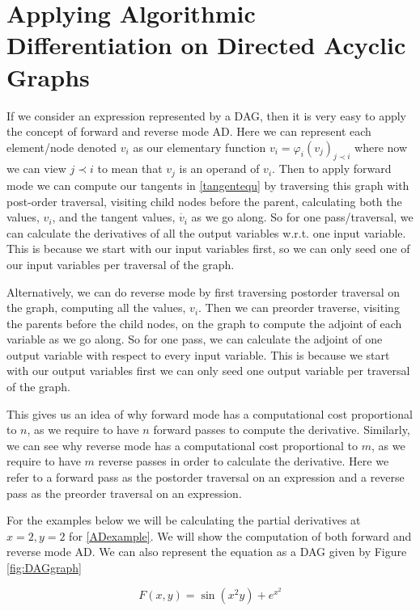 \documentclass{article}
\begin{document}
\section{Applying Algorithmic Differentiation on Directed Acyclic Graphs}

If we consider an expression represented by a DAG, then it is very easy to apply the concept of forward and reverse mode AD. Here we can represent each element/node denoted $v_i$ as our elementary function $v_i = \varphi_i (v_j)_{j \prec i}$ where now we can view $j \prec i$ to mean that $v_j$ is an operand of $v_i$. Then to apply forward mode we can compute our tangents in \eqref{tangentequ} by traversing this graph with post-order traversal, visiting child nodes before the parent, calculating both the values, $v_i$, and the tangent values, $\Dot{v_i}$ as we go along. So for one pass/traversal, we can calculate the derivatives of all the output variables w.r.t. one input variable. This is because we start with our input variables first, so we can only seed one of our input variables per traversal of the graph.

Alternatively, we can do reverse mode by first traversing postorder traversal on the graph, computing all the values, $v_i$. Then we can preorder traverse, visiting the parents before the child nodes, on the graph to compute the adjoint of each variable as we go along. So for one pass, we can calculate the adjoint of one output variable with respect to every input variable. This is because we start with our output variables first we can only seed one output variable per traversal of the graph.

This gives us an idea of why forward mode has a computational cost proportional to $n$, as we require to have $n$ forward passes to compute the derivative. Similarly, we can see why reverse mode has a computational cost proportional to $m$, as we require to have $m$ reverse passes in order to calculate the derivative. Here we refer to a forward pass as the postorder traversal on an expression and a reverse pass as the preorder traversal on an expression.

For the examples below we will be calculating the partial derivatives at $x=2, y=2$ for \eqref{ADexample}. We will show the computation of both forward and reverse mode AD. We can also represent the equation as a DAG given by Figure \ref{fig:DAGgraph}

\begin{equation}
    \label{ADexample}
    F(x,y) = \sin(x^2y) + e^{x^2}
\end{equation}
\end{document}
